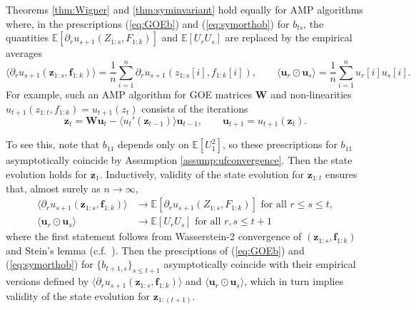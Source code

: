 \documentclass[10pt,reqno]{amsart}
\def\u{\mathbf{u}}
\def\z{\mathbf{z}}
\def\f{\mathbf{f}}
\def\W{\mathbf{W}}
\def\E{\mathbb{E}}
\begin{document}
\begin{remark}\label{remark:symempirical}
Theorems \ref{thm:Wigner} and \ref{thm:syminvariant} hold equally for AMP
algorithms where, in the prescriptions (\ref{eq:GOEb}) and (\ref{eq:symorthob})
for $b_{ts}$, the quantities
$\E[\partial_r u_{s+1}(Z_{1:s},F_{1:k})]$ and $\E[U_rU_s]$
are replaced by the empirical averages
\[\langle \partial_r u_{s+1}(\z_{1:s},\f_{1:k}) \rangle
=\frac{1}{n} \sum_{i=1}^n \partial_r u_{s+1}(z_{1:s}[i],f_{1:k}[i]),
\qquad \langle \u_r \odot \u_s \rangle=\frac{1}{n}\sum_{i=1}^n u_r[i]u_s[i].\]
For example, such an AMP algorithm for GOE matrices $\W$ and non-linearities
$u_{t+1}(z_{1:t},f_{1:k})=u_{t+1}(z_t)$ consists of the iterations
\[\z_t=\W\u_t-\langle u_t'(\z_{t-1}) \rangle \u_{t-1}, \qquad
\u_{t+1}=u_{t+1}(\z_t).\]

To see this, note that $b_{11}$ depends only on $\E[U_1^2]$, so these 
prescriptions for $b_{11}$ asymptotically coincide by Assumption
\ref{assump:ufconvergence}. Then the state evolution
holds for $\z_1$. 
Inductively, validity of the state evolution for 
$\z_{1:t}$ ensures that, almost surely as $n \to \infty$,
\begin{align*}
\langle \partial_r u_{s+1}(\z_{1:s},\f_{1:k}) \rangle &\to
\E[\partial_r u_{s+1}(Z_{1:s},F_{1:k})] \text{ for all } r \leq s \leq t,\\
\langle \u_r \odot \u_s \rangle &\to \E[U_rU_s] \text{ for all } r,s \leq t+1
\end{align*}
where the first statement follows from Wasserstein-2 convergence of
$(\z_{1:s},\f_{1:k})$ and Stein's lemma
(c.f.\ \cite[Proposition E.5]{fan2022approximate}).
Then the presciptions of (\ref{eq:GOEb}) and (\ref{eq:symorthob}) for
$\{b_{t+1,s}\}_{s \leq t+1}$
asymptotically coincide with their empirical versions defined by
$\langle \partial_r u_{s+1}(\z_{1:s},\f_{1:k}) \rangle$
and $\langle \u_r \odot \u_s \rangle$, which in turn implies validity of the
state evolution for $\z_{1:(t+1)}$.
\end{remark}
\end{document}

